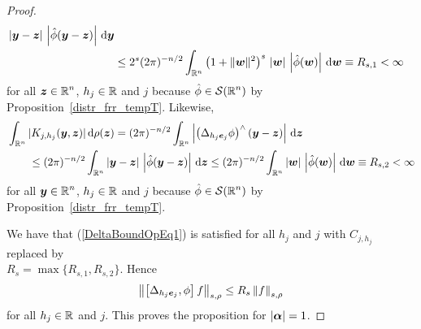 \begin{proof}
\begin{align*}
\,|{\bm{y}}-{\bm{z}}|\,
\left|\hat{\phi}({\bm{y}} -{\bm{z}})\right| \,\mathrm{d}{{\bm{y}}} \\
&\leq 2^s (2\pi)^{-n/2} \int_{\mathbb{R}^n} \left(1+\|{\bm{w}}\|^2\right)^{s}
\, |{\bm{w}}| \, \left|\hat{\phi}({\bm{w}})\right|\,\mathrm{d}{{\bm{w}}}
\equiv R_{s,1} < \infty
\end{align*}
for all $\displaystyle {\bm{z}}\in \mathbb{R}^n$, $h_j \in \mathbb{R}$ and $j$
because $\displaystyle \hat{\phi} \in \mathcal{S}(\mathbb{R}^n)$ by
Proposition~\ref{distr_frr_tempT}.  Likewise,
\begin{align*}
&\int_{\mathbb{R}^n} |K_{j,h_j}({\bm{y}}, {\bm{z}})| \,\mathrm{d}{\rho({\bm{z}})}
= (2\pi)^{-n/2}\int_{\mathbb{R}^n} \left| \left(\Delta_{h_j{\bm{e}}_j} \phi\right)^\wedge
({\bm{y}} - {\bm{z}})\right|\,\mathrm{d}{{\bm{z}}} \\
&\qquad \leq (2\pi)^{-n/2} \int_{\mathbb{R}^n} |{\bm{y}}-{\bm{z}}|\,
\left|\hat{\phi}({\bm{y}} -{\bm{z}}) \right|\,\mathrm{d}{{\bm{z}}}
\leq  (2\pi)^{-n/2}\int_{\mathbb{R}^n} |{\bm{w}}|\,
\left|\hat{\phi}({\bm{w}})\right|\,\mathrm{d}{{\bm{w}}} \equiv R_{s,2} < \infty
\end{align*}
for all $\displaystyle {\bm{y}}\in \mathbb{R}^n$, $h_j \in \mathbb{R}$ and $j$  because
$\displaystyle \hat{\phi} \in \mathcal{S}(\mathbb{R}^n)$ by Proposition~\ref{distr_frr_tempT}.

We have that (\ref{DeltaBoundOpEq1}) is satisfied for all $h_j$ and
$j$ with $C_{j,h_j}$ replaced by\\
$R_s = \max\{R_{s,1},R_{s,2}\}$.  Hence
\begin{equation} \label{DeltaBoundOpEq2}
\left\| \left[ \Delta_{h_j{\bm{e}}_j} ,\phi \right] f \right\|_{s,\rho}
\leq R_s \left\| f \right\|_{s,\rho}
\end{equation}
for all $h_j \in \mathbb{R}$ and $j$.  This proves the proposition for
$|{\bm{\alpha}}|=1$.


\end{proof}

